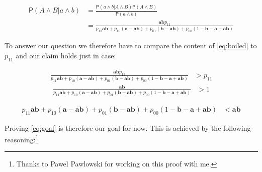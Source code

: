 \documentclass[10pt,dvipsnames,enabledeprecatedfontcommands]{scrartcl}
\newcommand{\et}{\wedge}
\newcommand{\pr}[1]{\mathsf{P}(#1)}
\begin{document}
\begin{align} \nonumber
\pr{A\et B \vert a\et b} & = \frac{\pr{a\et b \vert A \et B}\pr{A\et B}}{\pr{a\et b}}
\\ \label{eq:boiled}
& = \frac{\mathbf{ab}p_{11}}{p_{11}\mathbf{ab} + p_{10}(\mathbf{a}-\mathbf{ab}) + p_{01}(\mathbf{b}-\mathbf{ab})+p_{00}(1-\mathbf{b}-\mathbf{a}+\mathbf{ab})}
\end{align}

To answer our question we therefore have to compare the content of
\eqref{eq:boiled} to \(p_{11}\) and our claim holds just in case:

\begin{align*}
\frac{\mathbf{ab}p_{11}}{p_{11}\mathbf{ab} + p_{10}(\mathbf{a}-\mathbf{ab}) + p_{01}(\mathbf{b}-\mathbf{ab})+p_{00}(1-\mathbf{b}-\mathbf{a}+\mathbf{ab})} &> p_{11}
\end{align*}\begin{align*}
 \frac{\mathbf{ab}}{p_{11}\mathbf{ab} + p_{10}(\mathbf{a}-\mathbf{ab}) + p_{01}(\mathbf{b}-\mathbf{ab})+p_{00}(1-\mathbf{b}-\mathbf{a}+\mathbf{ab})} & > 1\end{align*}

\begin{align}  
 \label{eq:goal}
p_{11}\mathbf{ab} + p_{10}(\mathbf{a}-\mathbf{ab}) + p_{01}(\mathbf{b}-\mathbf{ab})+p_{00}(1-\mathbf{b}-\mathbf{a}+\mathbf{ab}) & < \mathbf{ab}
\end{align}

Proving \eqref{eq:goal} is therefore our goal for now. This is achieved
by the following
reasoning:\footnote{Thanks to Pawel Pawlowski for working on this proof with me.}
\end{document}
